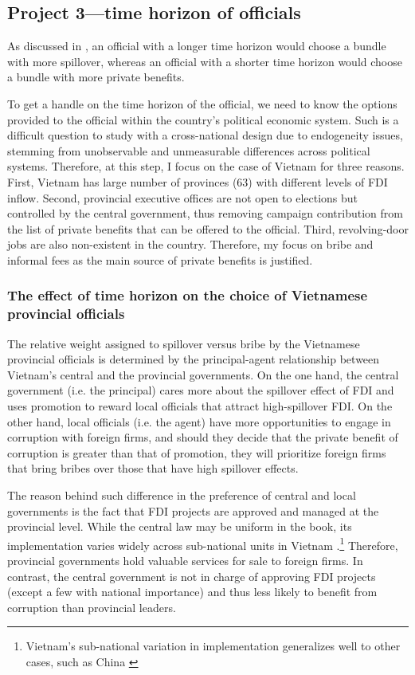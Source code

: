 \subsection{Project 3---time horizon of officials}
\label{sec:rd_time_horizon}

As discussed in , an official with a longer time horizon would choose a bundle with more spillover, whereas an official with a shorter time horizon would choose a bundle with more private benefits.

To get a handle on the time horizon of the official, we need to know the options provided to the official within the country's political economic system. Such is a difficult question to study with a cross-national design due to endogeneity issues, stemming from unobservable and unmeasurable differences across political systems. Therefore, at this step, I focus on the case of Vietnam for three reasons. First, Vietnam has large number of provinces (63) with different levels of FDI inflow. Second, provincial executive offices are not open to elections but controlled by the central government, thus removing campaign contribution from the list of private benefits that can be offered to the official. Third, revolving-door jobs are also non-existent in the country. Therefore, my focus on bribe and informal fees as the main source of private benefits is justified.

\subsubsection{The effect of time horizon on the choice of Vietnamese provincial officials} 

The relative weight assigned to spillover versus bribe by the Vietnamese provincial officials is determined by the principal-agent relationship between Vietnam's central and the provincial governments. On the one hand, the central government (i.e. the principal) cares more about the spillover effect of FDI and uses promotion to reward local officials that attract high-spillover FDI. On the other hand, local officials (i.e. the agent) have more opportunities to engage in corruption with foreign firms, and should they decide that the private benefit of corruption is greater than that of promotion, they will prioritize foreign firms that bring bribes over those that have high spillover effects.

The reason behind such difference in the preference of central and local governments is the fact that FDI projects are approved and managed at the provincial level. While the central law may be uniform in the book, its implementation varies widely across sub-national units in Vietnam \citep{Meyer2005}.\footnote{Vietnam's sub-national variation in implementation generalizes well to other cases, such as China \citep{Thun2006}} Therefore, provincial governments hold valuable services for sale to foreign firms. In contrast, the central government is not in charge of approving FDI projects (except a few with national importance) and thus less likely to benefit from corruption than provincial leaders.

